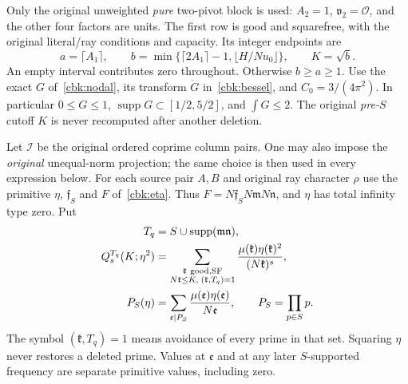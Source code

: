Only the original unweighted \emph{pure} two-pivot block is used:
$A_2=1$, $\mathfrak v_2=\mathcal O$, and the other four factors
are units. The first row is good and squarefree, with the original
literal/ray conditions and capacity. Its integer endpoints are
\begin{equation}\label{gtl:capacity}
 a=\lceil A_1\rceil,\qquad
 b=\min\{\lceil2A_1\rceil-1,\lfloor H/Nu_0\rfloor\},
 \qquad K=\sqrt b .
\end{equation}
An empty interval contributes zero throughout. Otherwise $b\ge a\ge1$.
Use the exact $G$ of~\eqref{cbk:nodal}, its transform
$\dot G$ in~\eqref{cbk:bessel}, and $C_0=3/(4\pi^2)$.
In particular $0\le G\le1$, $\operatorname{supp}G\subset[1/2,5/2]$,
and $\int G\le2$. The original \emph{pre-$S$} cutoff $K$ is never
recomputed after another deletion.

Let $\mathcal I$ be the original ordered coprime column pairs.
One may also impose the \emph{original} unequal-norm projection;
the same choice is then used in every expression below. For each
source pair $A,B$ and original ray character $\rho$ use the primitive
$\eta$, $\mathfrak f_S$ and $F$ of~\eqref{cbk:eta}. Thus
$F=N\mathfrak f_S N\mathfrak mN\mathfrak n$, and $\eta$ has total
infinity type zero. Put
\begin{equation}\label{gtl:deletions}
 \begin{aligned}
 T_q&=S\cup\operatorname{supp}(\mathfrak m\mathfrak n),\\
 Q_s^{T_q}(K;\eta^2)
   &=\sum_{\substack{\mathfrak k\ {\rm good,SF}\\
                   N\mathfrak k\le K,\;(\mathfrak k,T_q)=1}}
         \frac{\mu(\mathfrak k)\eta(\mathfrak k)^2}
              {(N\mathfrak k)^s},\\
 P_S(\eta)&=\sum_{\mathfrak e\mid P_S}
                   \frac{\mu(\mathfrak e)\eta(\mathfrak e)}
                        {N\mathfrak e},
 \qquad P_S=\prod_{p\in S}p .
 \end{aligned}
\end{equation}
The symbol $(\mathfrak k,T_q)=1$ means avoidance of every prime in
that set. Squaring $\eta$ never restores a deleted prime. Values at
$\mathfrak e$ and at any later $S$-supported frequency are separate
primitive values, including zero.


